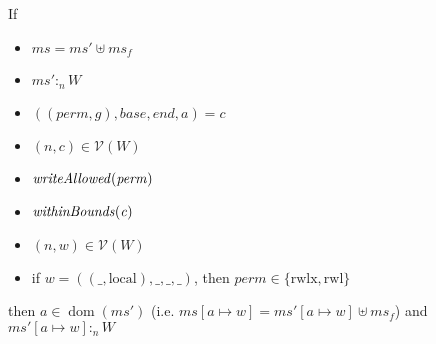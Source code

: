 \documentclass[a4paper]{article}
\newcommand{\update}[2]{[#1 \mapsto #2]}
\DeclareMathOperator{\dom}{dom}
\newcommand{\var}[1]{\mathit{#1}}
\newcommand{\hs}{\var{ms}}
\newcommand{\ms}{\hs}
\newcommand{\gl}{\var{g}}
\newcommand{\addr}{\var{a}}
\newcommand{\start}{\var{base}}
\newcommand{\addrend}{\var{end}}
\newcommand{\heap}{\var{mem}}
\newcommand{\perm}{\var{perm}}
\newcommand{\plainfun}[2]{
  \ifthenelse{\equal{#2}{}}
  {\mathit{#1}}
  {\mathit{#1}(#2)}
}
\newcommand{\writeAllowed}[1]{\plainfun{writeAllowed}{#1}}
\newcommand{\withinBounds}[1]{\plainfun{withinBounds}{#1}}
\newcommand{\heapSat}[3][\heap]{#1 :_{#2} #3}
\newcommand{\asmType}{\plaindom{AsmType}}
\newcommand{\plaindom}[1]{\mathrm{#1}}
\newcommand{\intr}[2]{\mathcal{#1}}
\newcommand{\valueintr}[1]{\intr{V}{#1}}
\newcommand{\stdvr}{\valueintr{\asmType}}
\newcommand{\npair}[2][n]{\left(#1,#2 \right)}
\newcommand{\plainperm}[1]{\mathrm{#1}}
\newcommand{\readwritel}{\plainperm{rwl}}
\newcommand{\rwlx}{\plainperm{rwlx}}
\newcommand{\local}{\plainperm{local}}
\begin{document}
 
 \begin{lemma}
   \label{lem:conds-store-suff}
   If 
   \begin{itemize}
   \item $\ms = \ms' \uplus \ms_f$
   \item $\heapSat[\ms']{n}{W}$
   \item $((\perm,\gl),\start,\addrend,\addr) = c$
   \item $\npair{c}\in\stdvr(W)$
   \item $\writeAllowed{\perm}$
   \item $\withinBounds{\var{c}}$
   \item $\npair{\var{w}}\in\stdvr(W)$
   \item if $\var{w} = ((\_,\local),\_,\_,\_)$, then $\perm \in
     \{\rwlx,\readwritel \}$
   \end{itemize}
 
   then $\addr \in \dom(\ms')$ (i.e. $\ms\update{a}{w} =
   \ms'\update{a}{w}\uplus\ms_f$) and
   $\heapSat[{\ms'\update{\addr}{\var{w}}}]{n}{W}$
 \end{lemma}
\end{document}
